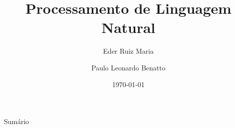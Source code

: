 \documentclass{beamer}
\title[Processamento de Linguagem Natural]{Processamento de Linguagem Natural}
\author[Eder Ruiz Maria \and Paulo Leonardo Benatto]{Eder Ruiz Maria \and Paulo Leonardo Benatto}
\institute{Universidade Estadual do Oeste do Paraná}
\date{\today}
\begin{document}
\frame{\titlepage}

\begin{frame}{Sumário}
	\tableofcontents[curretsection]
\end{frame}








\end{document}
